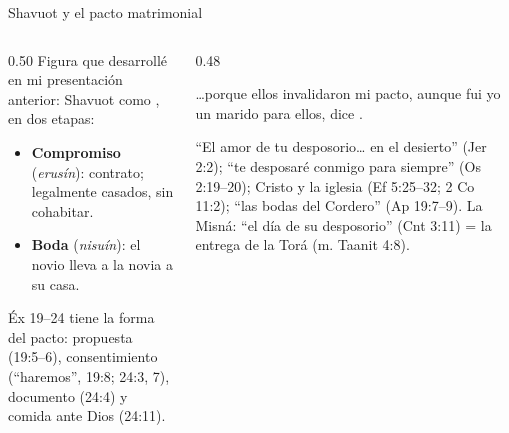 \begin{frame}{Shavuot y el pacto matrimonial}
\begin{columns}[t,onlytextwidth]
\begin{column}{0.50\textwidth}\small\RaggedRight
Figura que desarrollé en mi presentación anterior: Shavuot como , en dos etapas:
\begin{itemize}
\item \textbf{Compromiso} (\emph{erusín}): contrato; legalmente casados, sin cohabitar.
\item \textbf{Boda} (\emph{nisuín}): el novio lleva a la novia a su casa.
\end{itemize}
Éx 19--24 tiene la forma del pacto: propuesta (19:5--6), consentimiento (``haremos'', 19:8; 24:3, 7), documento (24:4) y comida ante Dios (24:11).
\end{column}
\begin{column}{0.48\textwidth}\scriptsize\RaggedRight
\begin{cita}\ldots{}porque ellos invalidaron mi pacto, aunque fui yo un marido para ellos, dice \SENOR.\end{cita}
``El amor de tu desposorio\ldots{} en el desierto'' (Jer 2:2); ``te desposaré conmigo para siempre'' (Os 2:19--20); Cristo y la iglesia (Ef 5:25--32; 2 Co 11:2); ``las bodas del Cordero'' (Ap 19:7--9). La Misná: ``el día de su desposorio'' (Cnt 3:11) = la entrega de la Torá (m. Taanit 4:8).\par\smallskip
{}
\end{column}
\end{columns}
\end{frame}

